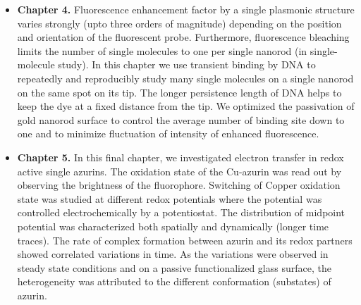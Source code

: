 \begin{itemize}
	\item \textbf{Chapter 4.} Fluorescence enhancement factor by a single plasmonic structure varies strongly  (upto three orders of magnitude) depending on the position and orientation of the fluorescent probe. Furthermore, fluorescence bleaching limits the number of single molecules to one per single nanorod (in single-molecule study). In this chapter we use transient binding by DNA to repeatedly and reproducibly study many single molecules on a single nanorod on the same spot on its tip. The longer persistence length of DNA helps to keep the dye at a fixed distance from the tip. We optimized the passivation of gold nanorod surface to control the average number of binding site down to one and to minimize fluctuation of intensity of enhanced fluorescence.

	\item \textbf{Chapter 5.} In this final chapter, we investigated electron transfer in redox active single azurins. The oxidation state of the Cu-azurin was read out by observing the brightness of the fluorophore. Switching of Copper oxidation state was studied at different redox potentials where the potential was controlled electrochemically by a potentiostat. The distribution of midpoint potential was characterized both spatially and dynamically (longer time traces). The rate of complex formation between azurin and its redox partners showed correlated variations in time. As the variations were observed in steady state conditions and on a passive functionalized glass surface, the heterogeneity was attributed to the different conformation (substates) of azurin.
\end{itemize}
